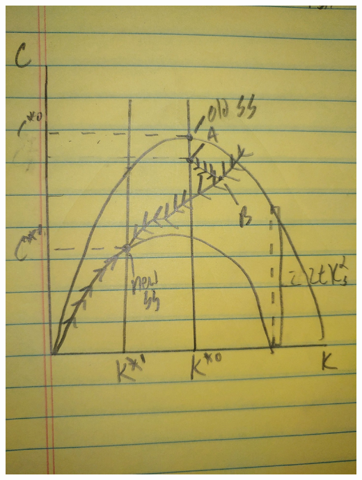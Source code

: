 \documentclass[11pt]{SelfArxOneColBMN}
\begin{document}
\begin{enumerate}
\begin{enumerate}
\begin{solution}
      \includegraphics[scale=.2]{graph2e.JPG}\\
      \centering
    \end{solution}
  \end{enumerate}
\end{enumerate}
\end{document}

